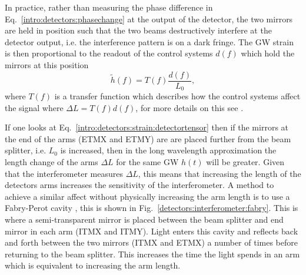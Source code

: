 In practice, rather than measuring the phase difference in
Eq.~\ref{intro:detectors:phasechange} at the output of the detector, the two mirrors are held in position such that the two beams destructively interfere at the detector output, i.e. the interference pattern is on a dark fringe.
%
%
The \gls{GW} strain is then proportional to the readout of the control systems $d(f)$ which hold the mirrors at this position \cite{ligoscientificcollaboration2017CalibrationAdvanced} 
\begin{equation}
    \tilde{h}(f) = T(f) \frac{d(f)}{L_0},
\end{equation}
where $T(f)$ is a transfer function which describes how the control systems affect the signal where $\Delta L = T(f) d(f)$, for more details on this see \cite{ligoscientificcollaboration2017CalibrationAdvanced}.

If one looks at Eq.~\ref{intro:detectors:strain:detectortensor} then if the mirrors at the
end of the arms (\gls{ETMX} and \gls{ETMY}) are are placed
further from the beam splitter, i.e. $L_0$ is increased, then in the long wavelength approximation the length change
of the arms $\Delta L$ for the same \gls{GW} $h(t)$ will be greater.  Given that the interferometer measures $\Delta L$, this means that
increasing the length of the detectors arms increases the sensitivity of the
interferometer.  A method to achieve a similar affect without physically
increasing the arm length is to use a Fabry-Perot cavity
\citep{aasi2015AdvancedLIGO}, this is shown in
Fig.~\ref{detectors:interferometer:fabry}.  This is where a semi-transparent
mirror is placed between the beam splitter and end mirror in each arm (\gls{ITMX} and
\gls{ITMY}).  Light enters this cavity and reflects
back and forth between the two mirrors (\gls{ITMX} and \gls{ETMX}) a number of times before
returning to the beam splitter.  This increases the time the light spends in
an arm which is equivalent to increasing the arm length.  

